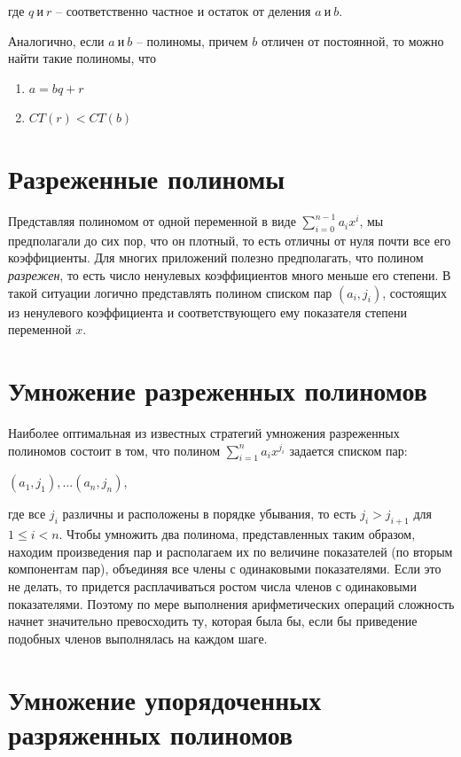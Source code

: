 \documentclass[bachelor, och, labwork]{shiza}
\begin{document}
где $q ~\text{и}~ r$ -- соответственно частное и остаток от деления $a ~\text{и}~ b$.

Аналогично, если $a ~\text{и}~ b$ -- полиномы, причем $b$ отличен от постоянной,
то можно найти такие полиномы, что
\begin{enumerate}
    \item $a=bq+r$
    \item $CT(r)<CT(b)$
\end{enumerate}

\section{Разреженные полиномы}
Представляя полиномом от одной переменной в виде $\sum\limits_{i=0}^{n-1}{a_ix^i}$,
мы предполагали до сих пор, что он плотный, то есть отличны от нуля почти все 
его коэффициенты. Для многих приложений полезно предполагать, что полином
\textit{разрежен}, то есть число ненулевых коэффициентов много меньше его степени.
В такой ситуации логично представлять полином списком пар $(a_i, j_i)$, состоящих
из ненулевого коэффициента и соответствующего ему показателя степени переменной
$x$. 

\section{Умножение разреженных полиномов}

Наиболее оптимальная из известных стратегий умножения разреженных \\полиномов
состоит в том, что полином $\sum\limits_{i=1}^n{a_ix^{j_i}}$ задается списком пар:
\begin{center}$(a_1,j_1),...(a_n,j_n)$,\end{center}
где все $j_i$ различны и расположены в порядке убывания,
то есть $j_i>j_{i+1}$ для $1\leq i < n$. Чтобы умножить два полинома,
представленных таким образом, находим произведения пар и располагаем их по
величине показателей (по вторым компонентам пар), объединяя все члены с одинаковыми
показателями. Если это не делать, то придется расплачиваться ростом числа членов
с одинаковыми показателями. Поэтому по мере выполнения арифметических операций
сложность начнет значительно превосходить ту, которая была бы, если бы приведение
подобных членов выполнялась на каждом шаге.

\section{Умножение упорядоченных разряженных полиномов}
\end{document}

